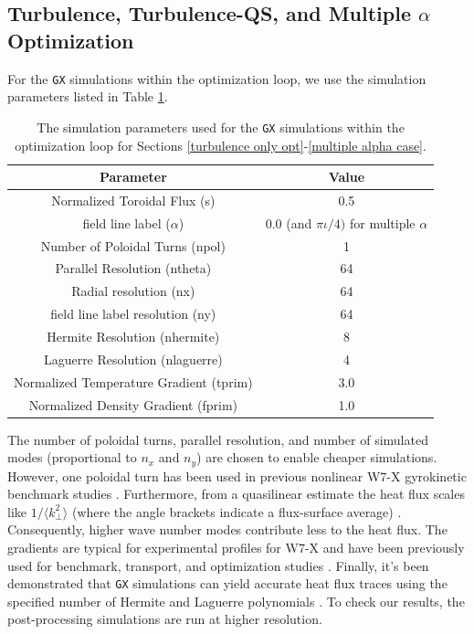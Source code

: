 \documentclass{jpp}
\begin{document}
\subsection{Turbulence, Turbulence-QS, and Multiple $\alpha$ Optimization}
For the {\tt GX} simulations within the optimization loop, we use the simulation parameters listed in Table \ref{sim table}.
\begin{table}
\centering
    \begin{tabular}{cc}
     \hline
 Parameter & Value\\ [0.5ex] 
 \hline\hline
 Normalized Toroidal Flux (s) & 0.5\\
 \hline
 field line label ($\alpha$) & 0.0 (and $\pi \iota/4)$ for multiple $\alpha$\\
 \hline
Number of Poloidal Turns (npol) & 1\\
\hline
Parallel Resolution (ntheta) & 64 \\
\hline
Radial resolution (nx)& 64 \\
\hline
field line label resolution (ny) & 64 \\
\hline
Hermite Resolution (nhermite) & 8 \\
\hline
Laguerre Resolution (nlaguerre) & 4\\
\hline
Normalized Temperature Gradient (tprim) & 3.0 \\
\hline
Normalized Density Gradient (fprim) & 1.0 \\
\hline
    \end{tabular}
\caption{The simulation parameters used for the {\tt GX} simulations within the optimization loop for Sections \ref{turbulence only opt}-\ref{multiple alpha case}.}
\label{sim table}
\end{table}

The number of poloidal turns, parallel resolution, and number of simulated modes (proportional to $n_x$ and $n_y$) are chosen to enable cheaper simulations. However, one poloidal turn has been used in previous nonlinear W7-X gyrokinetic benchmark studies \citep{Gonzalez-Jerez2022ElectrostaticGENEb}. Furthermore, from a quasilinear estimate the heat flux scales like $1/\langle k_{\perp}^2\rangle$ (where the angle brackets indicate a flux-surface average) \citep{Mariani2018IdentifyingFluxes}. Consequently, higher wave number modes contribute less to the heat flux. The gradients are typical for experimental profiles for W7-X \citep{Beurskens2021IonPlasmas} and have been previously used for benchmark, transport, and optimization studies \citep{Gonzalez-Jerez2022ElectrostaticGENE, BanonNavarro2023First-principlesStellarators, Roberg-Clark2022ReductionOptimization}. Finally, it's been demonstrated that {\tt GX} simulations can yield accurate heat flux traces using the specified number of Hermite and Laguerre polynomials \citep{Mandell2022GX:Design}. To check our results, the post-processing simulations are run at higher resolution.
\end{document}
